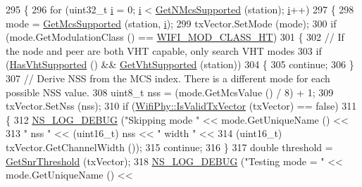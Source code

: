 \begin{DoxyCode}
295         \{
296           \textcolor{keywordflow}{for} (uint32\_t \hyperlink{bernuolliDistribution_8m_a6f6ccfcf58b31cb6412107d9d5281426}{i} = 0; \hyperlink{bernuolliDistribution_8m_a6f6ccfcf58b31cb6412107d9d5281426}{i} < \hyperlink{classns3_1_1WifiRemoteStationManager_a3b4fd7e5c50dfe3270831ad38de180e9}{GetNMcsSupported} (station); 
      \hyperlink{bernuolliDistribution_8m_a6f6ccfcf58b31cb6412107d9d5281426}{i}++)
297             \{
298               mode = \hyperlink{classns3_1_1WifiRemoteStationManager_af21ecff608cea2837c1af9385bbe6e4e}{GetMcsSupported} (station, \hyperlink{bernuolliDistribution_8m_a6f6ccfcf58b31cb6412107d9d5281426}{i});
299               txVector.SetMode (mode);
300               \textcolor{keywordflow}{if} (mode.GetModulationClass () == \hyperlink{namespacens3_aa999e1221606a2b21b1eb33c2007c217a6ac45cac36cc4454649435d24ebf349c}{WIFI\_MOD\_CLASS\_HT})
301                 \{
302                   \textcolor{comment}{// If the node and peer are both VHT capable, only search VHT modes}
303                   \textcolor{keywordflow}{if} (\hyperlink{classns3_1_1WifiRemoteStationManager_afae2836c7785854272d73bf33e58c95a}{HasVhtSupported} () && \hyperlink{classns3_1_1WifiRemoteStationManager_aecf5ed3203b9b55cd831696a08daa5fe}{GetVhtSupported} (station))
304                     \{
305                       \textcolor{keywordflow}{continue};
306                     \}
307                   \textcolor{comment}{// Derive NSS from the MCS index. There is a different mode for each possible NSS value.}
308                   uint8\_t nss = (mode.GetMcsValue () / 8) + 1;
309                   txVector.SetNss (nss);
310                   \textcolor{keywordflow}{if} (\hyperlink{classns3_1_1WifiPhy_a2df962f7fd9468b514ea16d5fbed97f6}{WifiPhy::IsValidTxVector} (txVector) == \textcolor{keyword}{false})
311                     \{
312                       \hyperlink{group__logging_ga413f1886406d49f59a6a0a89b77b4d0a}{NS\_LOG\_DEBUG} (\textcolor{stringliteral}{"Skipping mode "} << mode.GetUniqueName () <<
313                                     \textcolor{stringliteral}{" nss "} << (uint16\_t) nss << \textcolor{stringliteral}{" width "} <<
314                                     (uint16\_t) txVector.GetChannelWidth ());
315                       \textcolor{keywordflow}{continue};
316                     \}
317                   \textcolor{keywordtype}{double} threshold = \hyperlink{classns3_1_1IdealWifiManager_a4712a1357ab7ba3f2aba5b183cd18f6a}{GetSnrThreshold} (txVector);
318                   \hyperlink{group__logging_ga413f1886406d49f59a6a0a89b77b4d0a}{NS\_LOG\_DEBUG} (\textcolor{stringliteral}{"Testing mode = "} << mode.GetUniqueName () <<

\end{DoxyCode}
